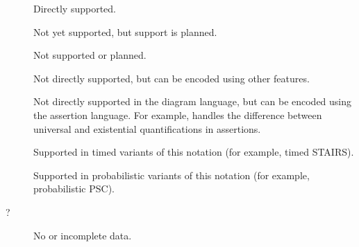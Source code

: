 \begin{description}
\item[\OK] Directly supported.
\item[\SOON] Not yet supported, but
  support is planned.
\item[\NO] Not supported or planned.
\item[\ISH] Not directly supported, but can be encoded using other
  features.
\item[\ASST] Not directly supported in the
  diagram language, but can be encoded using the
  assertion language.  For example, \langname{} handles
  the difference between universal and existential
  quantifications in assertions.
\item[\INTIMED] Supported in timed variants of this
  notation (for example, timed STAIRS).
\item[\INPROB] Supported in
  probabilistic variants of this
  notation (for example, probabilistic PSC). 
\item[?] No or incomplete data.
\end{description}

